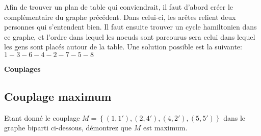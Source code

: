 \begin{figure}[h!]
  \begin{center}
  \end{center}
\end{figure}

\begin{solution}
Afin de trouver un plan de table qui conviendrait, il faut d'abord créer le complémentaire du graphe précédent. Dans celui-ci, les arêtes relient deux personnes qui s'entendent bien. Il faut ensuite trouver un cycle hamiltonien dans ce graphe, et l'ordre dans lequel les noeuds sont parcourus sera celui dans lequel les gens sont placés autour de la table. Une solution possible est la suivante:$1-3-6-4-2-7-5-8$
\end{solution}

\newpage

\textbf{Couplages}

\subsection{Couplage maximum}
Etant donné le couplage $M = \left\lbrace  (1,1'), (2,4'),(4,2'),(5,5')  \right\rbrace$ dans le graphe biparti ci-dessous, démontrez que $M$ est maximum.

